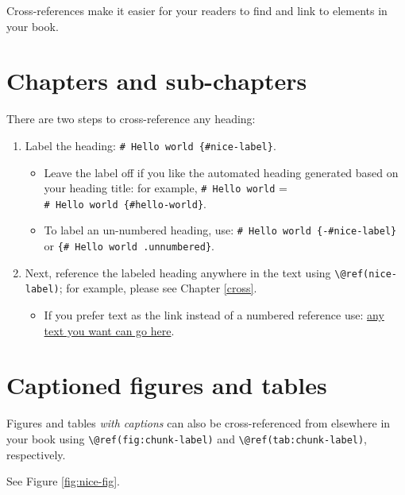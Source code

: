 \documentclass[
]{book}
\providecommand{\tightlist}{%
  \setlength{\itemsep}{0pt}\setlength{\parskip}{0pt}}
\theoremstyle{definition}
\theoremstyle{definition}
\theoremstyle{definition}
\theoremstyle{definition}
\theoremstyle{remark}
\begin{document}
Cross-references make it easier for your readers to find and link to elements in your book.

\hypertarget{chapters-and-sub-chapters}{%
\section{Chapters and sub-chapters}\label{chapters-and-sub-chapters}}

There are two steps to cross-reference any heading:

\begin{enumerate}
\def\labelenumi{\arabic{enumi}.}
\tightlist
\item
  Label the heading: \texttt{\#\ Hello\ world\ \{\#nice-label\}}.

  \begin{itemize}
  \tightlist
  \item
    Leave the label off if you like the automated heading generated based on your heading title: for example, \texttt{\#\ Hello\ world} = \texttt{\#\ Hello\ world\ \{\#hello-world\}}.
  \item
    To label an un-numbered heading, use: \texttt{\#\ Hello\ world\ \{-\#nice-label\}} or \texttt{\{\#\ Hello\ world\ .unnumbered\}}.
  \end{itemize}
\item
  Next, reference the labeled heading anywhere in the text using \texttt{\textbackslash{}@ref(nice-label)}; for example, please see Chapter \ref{cross}.

  \begin{itemize}
  \tightlist
  \item
    If you prefer text as the link instead of a numbered reference use: \protect\hyperlink{cross}{any text you want can go here}.
  \end{itemize}
\end{enumerate}

\hypertarget{captioned-figures-and-tables}{%
\section{Captioned figures and tables}\label{captioned-figures-and-tables}}

Figures and tables \emph{with captions} can also be cross-referenced from elsewhere in your book using \texttt{\textbackslash{}@ref(fig:chunk-label)} and \texttt{\textbackslash{}@ref(tab:chunk-label)}, respectively.

See Figure \ref{fig:nice-fig}.
\end{document}
